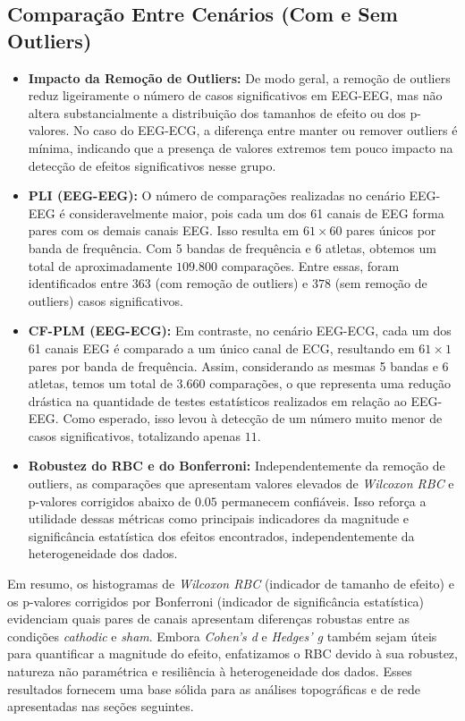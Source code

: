 \subsection{Comparação Entre Cenários (Com e Sem Outliers)}
\begin{itemize}
    \item \textbf{Impacto da Remoção de Outliers:} De modo geral, a remoção de outliers reduz ligeiramente o número de casos significativos em EEG-EEG, mas não altera substancialmente a distribuição dos tamanhos de efeito ou dos p-valores. No caso do EEG-ECG, a diferença entre manter ou remover outliers é mínima, indicando que a presença de valores extremos tem pouco impacto na detecção de efeitos significativos nesse grupo.

    \item \textbf{PLI (EEG-EEG):} O número de comparações realizadas no cenário EEG-EEG é consideravelmente maior, pois cada um dos 61 canais de EEG forma pares com os demais canais EEG. Isso resulta em \( 61 \times 60 \) pares únicos por banda de frequência. Com 5 bandas de frequência e 6 atletas, obtemos um total de aproximadamente \( 109.800 \) comparações. Entre essas, foram identificados entre \( 363 \) (com remoção de outliers) e \( 378 \) (sem remoção de outliers) casos significativos.

    \item \textbf{CF-PLM (EEG-ECG):} Em contraste, no cenário EEG-ECG, cada um dos 61 canais EEG é comparado a um único canal de ECG, resultando em \( 61 \times 1 \) pares por banda de frequência. Assim, considerando as mesmas 5 bandas e 6 atletas, temos um total de \( 3.660 \) comparações, o que representa uma redução drástica na quantidade de testes estatísticos realizados em relação ao EEG-EEG. Como esperado, isso levou à detecção de um número muito menor de casos significativos, totalizando apenas \( 11 \).

    \item \textbf{Robustez do RBC e do Bonferroni:} Independentemente da remoção de outliers, as comparações que apresentam valores elevados de \emph{Wilcoxon RBC} e p-valores corrigidos abaixo de \( 0.05 \) permanecem confiáveis. Isso reforça a utilidade dessas métricas como principais indicadores da magnitude e significância estatística dos efeitos encontrados, independentemente da heterogeneidade dos dados.
\end{itemize}

Em resumo, os histogramas de \emph{Wilcoxon RBC} (indicador de tamanho de efeito) e os p-valores corrigidos por Bonferroni (indicador de significância estatística) evidenciam quais pares de canais apresentam diferenças robustas entre as condições \textit{cathodic} e \textit{sham}. Embora \emph{Cohen's d} e \emph{Hedges' g} também sejam úteis para quantificar a magnitude do efeito, enfatizamos o RBC devido à sua robustez, natureza não paramétrica e resiliência à heterogeneidade dos dados. Esses resultados fornecem uma base sólida para as análises topográficas e de rede apresentadas nas seções seguintes.

